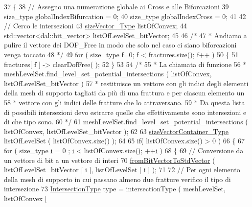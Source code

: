 \begin{DoxyCode}
37 \{
38     \textcolor{comment}{// Assegno una numerazione globale ai Cross e alle Biforcazioni}
39     size\_type globalIndexBifurcation = 0;
40     size\_type globalIndexCross = 0;
41 
42     \textcolor{comment}{// Cerco le intersezioni}
43     \hyperlink{Core_8h_a83c51913d041a5001e8683434c09857f}{sizeVector\_Type} listOfConvex;
44     std::vector<dal::bit\_vector> listOfLevelSet\_bitVector;
45 
46     \textcolor{comment}{/*}
47 \textcolor{comment}{     * Andiamo a pulire il vettore dei DOF\_Free in modo che solo nel caso ci siano biforcazioni venga
       toccato}
48 \textcolor{comment}{     */} 
49     \textcolor{keywordflow}{for} ( size\_type f=0; f < fractures.size(); f++ )
50     \{
51         fractures[ f ] -> clearDofFree( );
52     \}
53     
54     \textcolor{comment}{/*}
55 \textcolor{comment}{     * La chiamata di funzione }
56 \textcolor{comment}{     *              meshLevelSet.find\_level\_set\_potential\_intersections ( listOfConvex,
       listOfLevelSet\_bitVector )}
57 \textcolor{comment}{     * restituisce un vettore con gli indici degli elementi della mesh di supporto tagliati da più di una
       frattura e per ciascun elemento un}
58 \textcolor{comment}{     * vettore con gli indici delle fratture che lo attraversano. }
59 \textcolor{comment}{     * Da questa lista di possibili intersezioni devo estrarre quelle che effettivamente sono intersezioni
       e di che tipo sono.}
60 \textcolor{comment}{     */}
61     meshLevelSet.find\_level\_set\_potential\_intersections ( listOfConvex, listOfLevelSet\_bitVector );
62 
63     \hyperlink{Core_8h_a80e8381d86ecb0a7f4f87ff84d1a0be5}{sizeVectorContainer\_Type} listOfLevelSet ( listOfConvex.size() );
64 
65     \textcolor{keywordflow}{if}( listOfConvex.size() > 0 )
66     \{
67         \textcolor{keywordflow}{for} ( size\_type \hyperlink{matrici_8m_a6f6ccfcf58b31cb6412107d9d5281426}{i} = 0 ; \hyperlink{matrici_8m_a6f6ccfcf58b31cb6412107d9d5281426}{i} < listOfConvex.size(); ++\hyperlink{matrici_8m_a6f6ccfcf58b31cb6412107d9d5281426}{i} )
68         \{
69             \textcolor{comment}{// Conversione da un vettore di bit a un vettore di interi}
70             \hyperlink{UsefulFunctions_8h_a0ea0b08a12a1e6a94718cf3bcd60edeb}{fromBitVectorToStdVector} ( listOfLevelSet\_bitVector [ 
      \hyperlink{matrici_8m_a6f6ccfcf58b31cb6412107d9d5281426}{i} ], listOfLevelSet [ i ] );
71 
72             \textcolor{comment}{// Per ogni elemento della mesh di supporto in cui passano almeno due fratture verifico il tipo
       di intersezione}
73             \hyperlink{classFractureIntersect_a9a4e4a784fa4c8e359767ed543f89dc5}{IntersectionType} type = intersectionType ( meshLevelSet, listOfConvex [ 

\end{DoxyCode}
